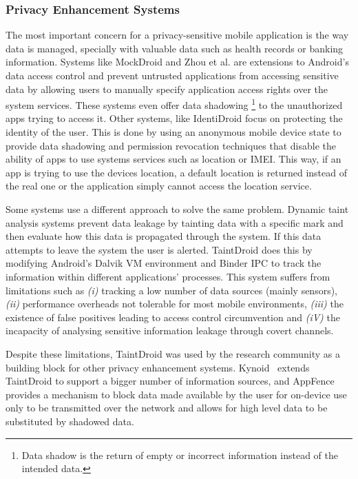 \subsubsection{Privacy Enhancement Systems}
\label{sec:privacyenhancement}

The most important concern for a privacy-sensitive mobile application is the way data is managed, specially with valuable data such as health records or banking information. Systems like MockDroid \cite{beresford2011mockdroid} and Zhou et al. \cite{zhou2011taming} are extensions to Android's data access control and prevent untrusted applications from accessing sensitive data by allowing users to manually specify application access rights over the system services. These systems even offer data shadowing \footnote{Data shadow is the return of empty or incorrect information instead of the intended data.} to the unauthorized apps trying to access it. Other systems, like IdentiDroid \cite{shebaro2014identidroid} focus on protecting the identity of the user. This is done by using an anonymous mobile device state to provide data shadowing and permission revocation techniques that disable the ability of apps to use systems services such as location or \ac{IMEI}. This way, if an app is trying to use the devices location, a default location is returned instead of the real one or the application simply cannot access the location service.

Some systems use a different approach to solve the same problem. Dynamic taint analysis systems prevent data leakage by tainting data with a specific mark and then evaluate how this data is propagated through the system. If this data attempts to leave the system the user is alerted. TaintDroid \cite{enck2014taintdroid} does this by modifying Android's Dalvik VM environment and Binder \ac{IPC} to track the information within different applications' processes. This system suffers from limitations such as \emph{(i)} tracking a low number of data sources (mainly sensors), \emph{(ii)} performance overheads not tolerable for most mobile environments, \emph{(iii)} the existence of false positives leading to access control circumvention and \emph{(iV)} the incapacity of analysing sensitive information leakage through covert channels.

Despite these limitations, TaintDroid was used by the research community as a building block for other privacy enhancement systems. Kynoid~\cite{schreckling2013kynoid} extends TaintDroid to support a bigger number of information sources, and AppFence~\cite{hornyack2011these} provides a mechanism to block data made available by the user for on-device use only to be transmitted over the network and allows for high level data to be substituted by shadowed data.

